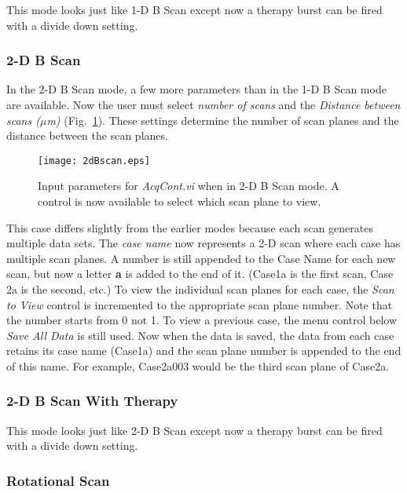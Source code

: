 \documentclass[10pt]{article}
\begin{document}
This mode looks just like 1-D B Scan except now a therapy burst
can be fired with a divide down setting.

\subsubsection{2-D B Scan}

In the 2-D B Scan mode, a few more parameters than in the 1-D B
Scan mode are available. Now the user must select {\it number of
scans} and the {\it Distance between scans ($\mu$m)}
(Fig.~\ref{fig:2dBscan}). These settings determine the number of
scan planes and the distance between the scan planes.

\begin{figure}[htb]
\begin{center}
\texttt{[image: 2dBscan.eps]}
 \caption{Input parameters for {\it AcqCont.vi} when in 2-D B Scan mode.
 A control is now available to select which scan plane to view.}
 \label{fig:2dBscan}
\end{center}
\end{figure}

This case differs slightly from the earlier modes because each
scan generates multiple data sets. The {\it case name} now
represents a 2-D scan where each case has multiple scan planes. A
number is still appended to the Case Name for each new scan, but
now a letter {\bf a} is added to the end of it. (Case1a is the
first scan, Case 2a is the second, etc.) To view the individual
scan planes for each case, the {\it Scan to View} control is
incremented to the appropriate scan plane number. Note that the
number starts from 0 not 1. To view a previous case, the menu
control below {\it Save All Data} is still used. Now when the data
is saved, the data from each case retains its case name (Case1a)
and the scan plane number is appended to the end of this name. For
example, Case2a003 would be the third scan plane of Case2a.


\subsubsection{2-D B Scan With Therapy}

This mode looks just like 2-D B Scan except now a therapy burst
can be fired with a divide down setting.

\subsubsection{Rotational Scan}
\end{document}

